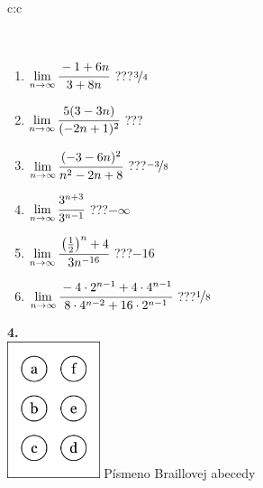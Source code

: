 \documentclass[10pt]{report}
\begin{document}
\begin{tabular}{c:c}
\begin{minipage}[c][104.5mm][t]{0.5\linewidth}
\begin{center}
\begin{minipage}{0.95\linewidth}
\begin{center}
\end{center}
\end{minipage}
\\[1mm]
\begin{minipage}{0.79\linewidth}
\begin{center}
\begin{varwidth}{\linewidth}
\begin{enumerate}
\normalsize
\item $\lim\limits_{n\to\infty}\cfrac{-1+6n}{3+8n}$\quad \dotfill\; ???\;\dotfill \quad $\nicefrac{3}{4}$
\item $\lim\limits_{n\to\infty}\cfrac{5(3-3n)}{(-2n+1)^2}$\quad \dotfill\; ???\;\dotfill {}
\item $\lim\limits_{n\to\infty}\cfrac{(-3-6n)^2}{n^2-2n+8}$\quad \dotfill\; ???\;\dotfill \quad $\nicefrac{-3}{8}$
\item $\lim\limits_{n\to\infty}\cfrac{3^{n+3}}{3^{n-1}}$\quad \dotfill\; ???\;\dotfill \quad $-\infty$
\item $\lim\limits_{n\to\infty}\cfrac{\left(\frac{1}{2}\right)^n +4}{3n^{-16}}$\quad \dotfill\; ???\;\dotfill \quad $-16$
\item $\lim\limits_{n\to\infty}\cfrac{-4\cdot 2^{n-1}+4\cdot 4^{n-1}}{8\cdot 4^{n-2}+16\cdot 2^{n-1}}$\quad \dotfill\; ???\;\dotfill \quad $\nicefrac{1}{8}$
\end{enumerate}
\end{varwidth}
\end{center}
\end{minipage}
\begin{minipage}{0.20\linewidth}
\begin{center}
{\Huge\bfseries 4.} \\[2mm]
\includegraphics[height=40mm]{../images/braille.png}
{\small Písmeno Braillovej abecedy}
\end{center}
\end{minipage}
\end{center}
\end{minipage}
%
\end{tabular}
\newpage
\thispagestyle{empty}
\end{document}
